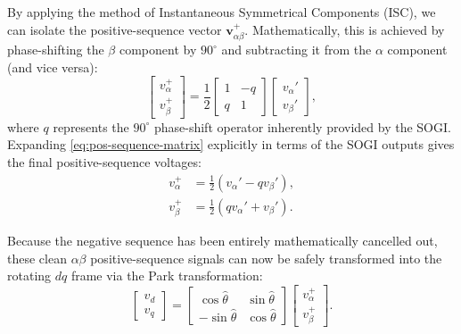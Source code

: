 By applying the method of Instantaneous Symmetrical Components (ISC), we can isolate the positive-sequence vector \(\mathbf{v}_{\alpha\beta}^+\). Mathematically, this is achieved by phase-shifting the \(\beta\) component by \(90^\circ\) and subtracting it from the \(\alpha\) component (and vice versa):
\begin{equation}
	\label{eq:pos-sequence-matrix}
	\begin{bmatrix} v_\alpha^+ \\ v_\beta^+ \end{bmatrix}
	= \frac{1}{2} \begin{bmatrix} 
		1 & -q \\ 
		q & 1 
	  \end{bmatrix} 
	\begin{bmatrix} v_\alpha' \\ v_\beta' \end{bmatrix},
\end{equation}
where \(q\) represents the \(90^\circ\) phase-shift operator inherently provided by the SOGI. Expanding \eqref{eq:pos-sequence-matrix} explicitly in terms of the SOGI outputs gives the final positive-sequence voltages:
\begin{equation}
	\label{eq:dsogi-explicit}
	\begin{aligned}
		v_\alpha^+ &= \frac{1}{2} \left( v_\alpha' - qv_\beta' \right), \\
		v_\beta^+  &= \frac{1}{2} \left( qv_\alpha' + v_\beta' \right).
	\end{aligned}
\end{equation}

Because the negative sequence has been entirely mathematically cancelled out, these clean \(\alpha\beta\) positive-sequence signals can now be safely transformed into the rotating \(dq\) frame via the Park transformation:
\begin{equation}
	\label{eq:sogi-park-transform}
	\begin{bmatrix} v_d \\ v_q \end{bmatrix}
	= \begin{bmatrix} 
		\cos\hat{\theta} & \sin\hat{\theta} \\ 
		-\sin\hat{\theta} & \cos\hat{\theta} 
	  \end{bmatrix} 
	\begin{bmatrix} v_\alpha^+ \\ v_\beta^+ \end{bmatrix}.
\end{equation}

